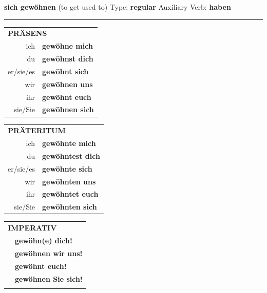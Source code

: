 \documentclass[10pt,a4paper]{revtex4-2}
\begin{document}
\begin{verbbox}
    {\Large \bf sich gewöhnen} (to get used to) \hfill Type: \textbf{regular} \hfill Auxiliary Verb: \textbf{haben} 
    
     \vspace{5pt}

    \hrule
    
    \vspace{5pt}

  \begin{tabular}{rl}
     \multicolumn{2}{l}{\textbf{PRÄSENS} }\\
    ich & \textbf{gewöhne mich}\\
    du & \textbf{gewöhnst dich}\\
    er/sie/es & \textbf{gewöhnt sich}\\
    wir & \textbf{gewöhnen uns}\\
    ihr & \textbf{gewöhnt euch}\\
    sie/Sie & \textbf{gewöhnen sich}\\
  \end{tabular}
  \hfill
     \begin{tabular}{rl}
    \multicolumn{2}{l}{\textbf{PRÄTERITUM} }\\
    ich & \textbf{gewöhnte mich}\\
    du & \textbf{gewöhntest dich}\\
    er/sie/es & \textbf{gewöhnte sich}\\
    wir & \textbf{gewöhnten uns}\\
    ihr & \textbf{gewöhntet euch}\\
    sie/Sie & \textbf{gewöhnten sich}\\
  \end{tabular}
  \hfill
  \begin{tabular}{rl}
     \multicolumn{2}{l}{\textbf{IMPERATIV} }\\
   & \textbf{gewöhn(e) dich!}\\
   & \textbf{gewöhnen wir uns!}\\
   & \textbf{gewöhnt euch!}\\
   & \textbf{gewöhnen Sie sich!}\\
   & \vspace{10pt}
  \end{tabular}

    \vspace{10pt}


\end{verbbox}
\end{document}
